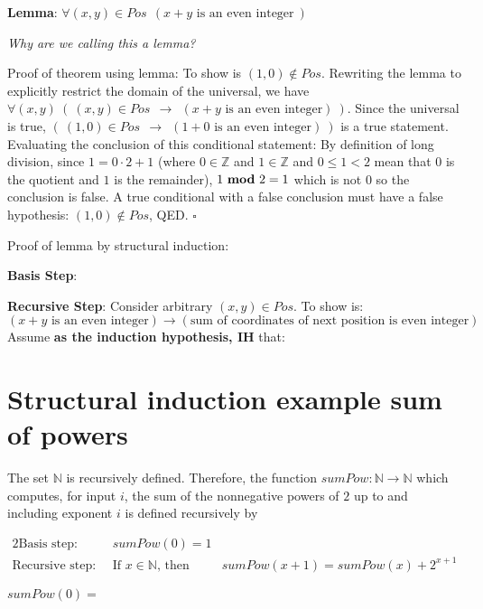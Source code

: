 \documentclass[12pt, oneside]{article}
\begin{document}
{\bf Lemma}: $\forall (x,y) \in Pos~~( x+y \textrm{ is an even integer}~)$

{\it Why are we calling this a lemma?}


Proof of theorem using lemma: To show is $(1,0) \notin Pos$. Rewriting the lemma to explicitly 
restrict the domain of the universal, 
we have $\forall (x,y) ~(~ (x,y) \in Pos~~  \to ~~(x+y \textrm{ is an even integer})~)$.  Since
the universal is true, 
$ (~ (1,0) \in Pos~~ \to ~~(1+0 \textrm{ is an even integer})~)$ is a true statement.
Evaluating the conclusion of this conditional statement: 
By definition of long division, since $1 = 0 \cdot 2 + 1$ (where $0 \in \mathbb{Z}$ and 
$1 \in \mathbb{Z}$ and $0 \leq 1 < 2$ mean that $0$ is the quotient and $1$ is the remainder), $1 ~\textrm{\bf mod}~ 2 = 1$ which is not $0$ 
so the conclusion is false.  A true conditional with a false conclusion must have a false hypothesis: $(1,0) \notin Pos$, QED. $\square$

\vspace{20pt}

Proof of lemma by structural induction:

{\bf Basis Step}:

\vspace{100pt}


{\bf Recursive Step}:  Consider arbitrary $(x,y) \in Pos$.  To show is:
\[
(x+y \text{ is an even integer}) \to (\text{sum of coordinates of next position is even integer})
\]
Assume {\bf as the induction hypothesis, IH} that: 


\vspace{400pt} \vfill
\section*{Structural induction example sum of powers}


The set $\mathbb{N}$ is recursively defined.
Therefore, the function $sumPow: \mathbb{N} \to \mathbb{N}$
which computes, for input $i$, the sum of the nonnegative powers of $2$
up to and including exponent $i$ is defined
recursively by

\begin{alignat*}{2}
    \text{Basis step:  } \qquad & sumPow(0) = 1 &\\
    \text{Recursive step:  } & \text{If } x \in \mathbb{N} \text{, then } &sumPow(x+1) = sumPow(x) + 2^{x+1}
\end{alignat*}

$sumPow(0) =$
\end{document}
